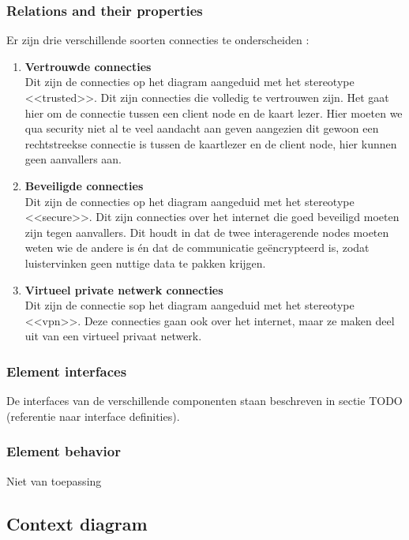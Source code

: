 \documentclass[a4paper,10pt]{paper}
\begin{document}
\subsubsection{Relations and their properties}
\label{subsubsec:relations_deployment}
Er zijn drie verschillende soorten connecties te onderscheiden : 
\begin{enumerate}
 \item \textbf{Vertrouwde connecties}\\
Dit zijn de connecties op het diagram aangeduid met het stereotype <<trusted>>. Dit zijn connecties die volledig te vertrouwen zijn. Het gaat hier om de connectie tussen een client node en de kaart lezer. Hier moeten we qua security niet al te veel aandacht aan geven aangezien dit gewoon een rechtstreekse connectie is tussen de kaartlezer en de client node, hier kunnen geen aanvallers aan. 
\item \textbf{Beveiligde connecties}\\
Dit zijn de connecties op het diagram aangeduid met het stereotype <<secure>>. Dit zijn connecties over het internet die goed beveiligd moeten zijn tegen aanvallers. Dit houdt in dat de twee interagerende nodes moeten weten wie de andere is én dat de communicatie geëncrypteerd is, zodat luistervinken geen nuttige data te pakken krijgen.
\item \textbf{Virtueel private netwerk connecties}\\
Dit zijn de connectie sop het diagram aangeduid met het stereotype <<vpn>>. Deze connecties gaan ook over het internet, maar ze maken deel uit van een virtueel privaat netwerk.
\end{enumerate}

\subsubsection{Element interfaces}

De interfaces van de verschillende componenten staan beschreven in sectie TODO (referentie naar interface definities).

\subsubsection{Element behavior}

Niet van toepassing

\subsection{Context diagram}
\end{document}
